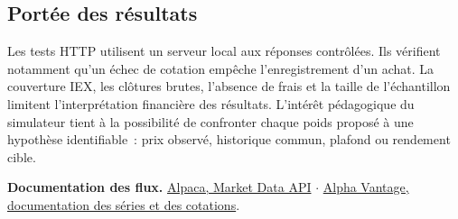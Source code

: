 \documentclass[11pt,a4paper]{article}
\begin{document}
\subsection*{Portée des résultats}
Les tests HTTP utilisent un serveur local aux réponses contrôlées. Ils vérifient notamment qu'un échec de cotation empêche l'enregistrement d'un achat. La couverture IEX, les clôtures brutes, l'absence de frais et la taille de l'échantillon limitent l'interprétation financière des résultats. L'intérêt pédagogique du simulateur tient à la possibilité de confronter chaque poids proposé à une hypothèse identifiable~: prix observé, historique commun, plafond ou rendement cible.

\smallskip
{\small\textbf{Documentation des flux.}
\href{https://docs.alpaca.markets/us/docs/about-market-data-api}{Alpaca, Market Data API}
\quad$\cdot$\quad
\href{https://www.alphavantage.co/documentation/}{Alpha Vantage, documentation des séries et des cotations}.}
\end{document}
